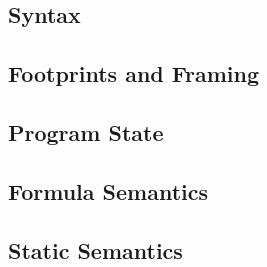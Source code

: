 \label{sec:language}


\subsection{Syntax}
\label{sec:syntax}


%    

%    

\subsection{Footprints and Framing}
\label{ssec:framing}


\subsection{Program State}
\label{ssec:program-state}


\subsection{Formula Semantics}
\label{ssec:formula-semantics}


%        

\subsection{Static Semantics}
\label{sec:static-semantics}


%    

